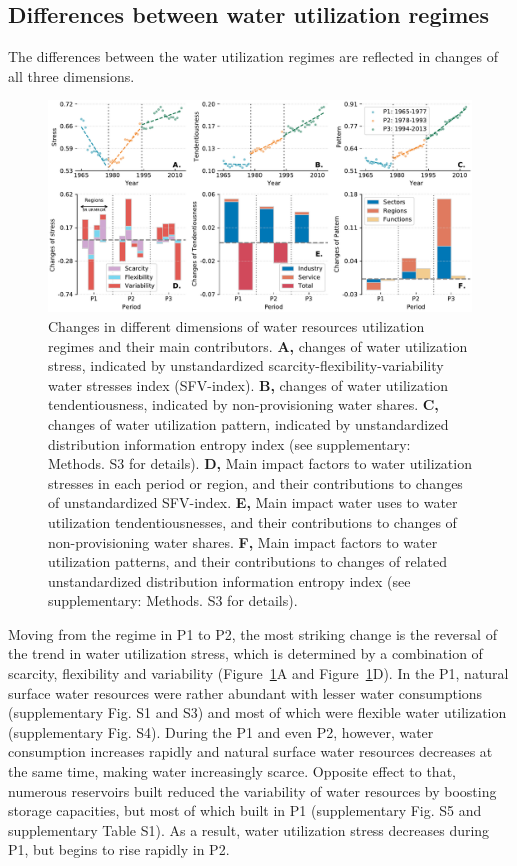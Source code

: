 \documentclass[9pt, twocolumn, twoside, lineno]{pnas-new}
\begin{document}
\subsection*{Differences between water utilization regimes}
The differences between the water utilization regimes are reflected in changes of all three dimensions.
\begin{figure}%
	\centering
	\includegraphics[width=\linewidth]{../../figures/main/dimensions.pdf}
	\caption{
		Changes in different dimensions of water resources utilization regimes and their main contributors.
		\textbf{A,} changes of water utilization stress, indicated by unstandardized scarcity-flexibility-variability water stresses index (SFV-index).
		\textbf{B,} changes of water utilization tendentiousness, indicated by non-provisioning water shares.
		\textbf{C,} changes of water utilization pattern, indicated by unstandardized distribution information entropy index (see supplementary: Methods. S3 for details).
		\textbf{D,} Main impact factors to water utilization stresses in each period or region, and their contributions to changes of unstandardized SFV-index.
		\textbf{E,} Main impact water uses to water utilization tendentiousnesses, and their contributions to changes of non-provisioning water shares.
		\textbf{F,} Main impact factors to water utilization patterns, and their contributions to changes of related unstandardized distribution information entropy index (see supplementary: Methods. S3 for details).
		}
	\label{fig:dimensions}
\end{figure}
Moving from the regime in P1 to P2, the most striking change is the reversal of the trend in water utilization stress, which is determined by a combination of scarcity, flexibility and variability (Figure~\ref{fig:dimensions}A and Figure~\ref{fig:dimensions}D).   
In the P1, natural surface water resources were rather abundant with lesser water consumptions (supplementary Fig. S1 and S3) and most of which were flexible water utilization (supplementary Fig. S4). During the P1 and even P2, however, water consumption increases rapidly and natural surface water resources decreases at the same time, making water increasingly scarce. Opposite effect to that, numerous reservoirs built reduced the variability of water resources by boosting storage capacities, but most of which built in P1 (supplementary Fig. S5 and supplementary Table S1). As a result, water utilization stress decreases during P1, but begins to rise rapidly in P2.
\end{document}
